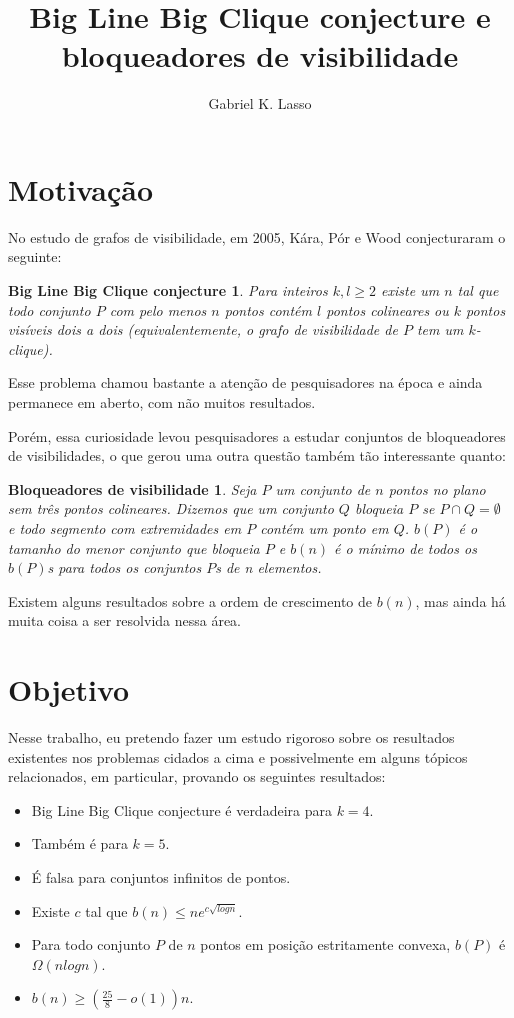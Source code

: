 \documentclass[a4paper]{article}
\title{Big Line Big Clique conjecture e bloqueadores de visibilidade}
\author{Gabriel K. Lasso}
\date{}
\newtheorem*{bigline}{Big Line Big Clique conjecture}
\newtheorem*{bloqueadores}{Bloqueadores de visibilidade}
\begin{document}
\maketitle
\section{Motivação}
No estudo de grafos de visibilidade, em 2005, Kára, Pór e Wood\cite{visibilitygraph} conjecturaram o seguinte:
\begin{bigline}
Para inteiros $k, l\geq 2$ existe um $n$ tal que todo conjunto $P$ com pelo menos $n$ pontos contém $l$ pontos colineares ou $k$ pontos visíveis dois a dois (equivalentemente, o grafo de visibilidade de $P$ tem um $k$-clique).
\end{bigline}
Esse problema chamou bastante a atenção de pesquisadores na época\cite{pentagon, visblock, infinity} e ainda permanece em aberto, com não muitos resultados.

Porém, essa curiosidade levou pesquisadores a estudar conjuntos de bloqueadores de visibilidades, o que gerou uma outra questão também tão interessante quanto:
\begin{bloqueadores}
Seja $P$ um conjunto de $n$ pontos no plano sem três pontos colineares. Dizemos que um conjunto $Q$ bloqueia $P$ se $P\cap Q=\emptyset$ e todo segmento com extremidades em $P$ contém um ponto em $Q$. $b(P)$ é o tamanho do menor conjunto que bloqueia $P$ e $b(n)$ é o mínimo de todos os $b(P)$s para todos os conjuntos $P$s de n elementos.
\end{bloqueadores}
Existem alguns resultados sobre a ordem de crescimento de $b(n)$, mas ainda há muita coisa a ser resolvida nessa área.

\section{Objetivo}
Nesse trabalho, eu pretendo fazer um estudo rigoroso sobre os resultados existentes nos problemas cidados a cima e possivelmente em alguns tópicos relacionados, em particular, provando os seguintes resultados:
\begin{itemize}
\item
    Big Line Big Clique conjecture é verdadeira para $k=4$\cite{visibilitygraph}.
\item
    Também é para $k=5$\cite{pentagon}.
\item
    É falsa para conjuntos infinitos de pontos\cite{infinity}.
\item
    Existe $c$ tal que $b(n)\leq ne^{c\sqrt{logn}}$\cite{blockers}.
\item
    Para todo conjunto $P$ de $n$ pontos em posição estritamente convexa, $b(P)$ é $\Omega(nlogn)$\cite{blockers}.
\item
    $b(n)\geq(\frac{25}{8}-o(1))n$\cite{block}.
\end{itemize}


{}
\end{document}
